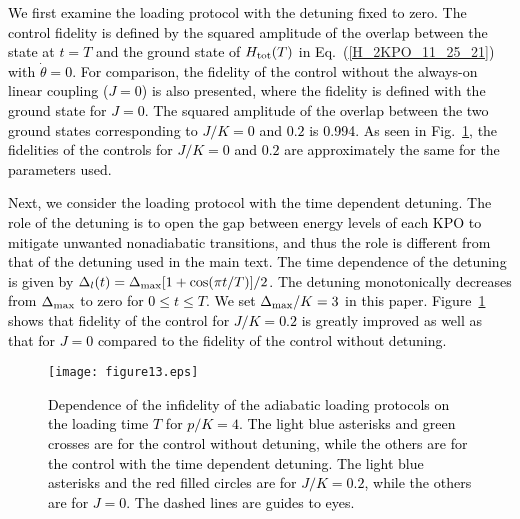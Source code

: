 \documentclass[%
 reprint,
 amsmath,amssymb,
 aps,
pra,
]{revtex4-2}
\begin{document}
\textcolor{black}{
We first examine the loading protocol with the detuning fixed to zero.
The control fidelity is defined by the squared amplitude of the overlap between the state at $t=T$ and the  ground state of $H_{\rm tot}(T)$ in Eq.~(\ref{H_2KPO_11_25_21}) with $\dot\theta=0$.
For comparison, the fidelity of the control without the always-on linear coupling ($J=0$) is also presented, where the fidelity is defined with the ground state for $J=0$.
The squared amplitude of the overlap between the two ground states corresponding to $J/K=0$ and $0.2$ is 0.994. 
As seen in Fig.~\ref{fid_p4_com_6_25_22}, the fidelities of the controls for $J/K=0$ and $0.2$ are approximately the same for the parameters used. 
}


\textcolor{black}{
Next, we consider the loading protocol with the time dependent detuning.
The role of the detuning is to open the gap between energy levels of each KPO to mitigate unwanted nonadiabatic transitions, and thus the role is different from that of the detuning used in the main text. 
The time dependence of the detuning is given by $\Delta_l(t)=\Delta_{\rm max}[1 + \cos(\pi t/T) ] / 2$.
The detuning monotonically decreases from $\Delta_{\rm max}$ to zero for $0\le t\le T$. 
We set $\Delta_{\rm max}/K=3$ in this paper.
Figure~\ref{fid_p4_com_6_25_22} shows that fidelity of the control for $J/K=0.2$ is greatly improved
as well as that for  $J=0$ compared to the fidelity of the control without detuning.
}
\begin{figure}
\begin{center}
\texttt{[image: figure13.eps]}
\end{center}
\caption{
\textcolor{black}{
Dependence of the infidelity of the adiabatic loading protocols on the loading time $T$ for $p/K=4$. 
The light blue asterisks and green crosses are for the control without detuning,
while the others are for the control with the time dependent detuning.
The light blue asterisks and the red filled circles are for $J/K=0.2$, while the others are for $J=0$.
The dashed lines are guides to eyes.
}
}
\label{fid_p4_com_6_25_22}
\end{figure}
\end{document}
